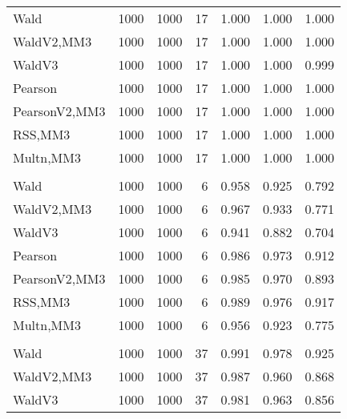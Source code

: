 \documentclass[
]{article}
\begin{document}
\begin{table}[H]
{\begin{tabular}[t]{lrrrrrr}
\hspace{1em}Wald & 1000 & 1000 & 17 & 1.000 & 1.000 & 1.000\\
\hspace{1em}WaldV2,MM3 & 1000 & 1000 & 17 & 1.000 & 1.000 & 1.000\\
\hspace{1em}WaldV3 & 1000 & 1000 & 17 & 1.000 & 1.000 & 0.999\\
\hspace{1em}Pearson & 1000 & 1000 & 17 & 1.000 & 1.000 & 1.000\\
\hspace{1em}PearsonV2,MM3 & 1000 & 1000 & 17 & 1.000 & 1.000 & 1.000\\
\hspace{1em}RSS,MM3 & 1000 & 1000 & 17 & 1.000 & 1.000 & 1.000\\
\hspace{1em}Multn,MM3 & 1000 & 1000 & 17 & 1.000 & 1.000 & 1.000\\
\addlinespace[0.3em]
\multicolumn{7}{l}{\textbf{2F 10V}}\\
\hspace{1em}Wald & 1000 & 1000 & 6 & 0.958 & 0.925 & 0.792\\
\hspace{1em}WaldV2,MM3 & 1000 & 1000 & 6 & 0.967 & 0.933 & 0.771\\
\hspace{1em}WaldV3 & 1000 & 1000 & 6 & 0.941 & 0.882 & 0.704\\
\hspace{1em}Pearson & 1000 & 1000 & 6 & 0.986 & 0.973 & 0.912\\
\hspace{1em}PearsonV2,MM3 & 1000 & 1000 & 6 & 0.985 & 0.970 & 0.893\\
\hspace{1em}RSS,MM3 & 1000 & 1000 & 6 & 0.989 & 0.976 & 0.917\\
\hspace{1em}Multn,MM3 & 1000 & 1000 & 6 & 0.956 & 0.923 & 0.775\\
\addlinespace[0.3em]
\multicolumn{7}{l}{\textbf{3F 15V}}\\
\hspace{1em}Wald & 1000 & 1000 & 37 & 0.991 & 0.978 & 0.925\\
\hspace{1em}WaldV2,MM3 & 1000 & 1000 & 37 & 0.987 & 0.960 & 0.868\\
\hspace{1em}WaldV3 & 1000 & 1000 & 37 & 0.981 & 0.963 & 0.856\\

\end{tabular}}
\end{table}
\end{document}
